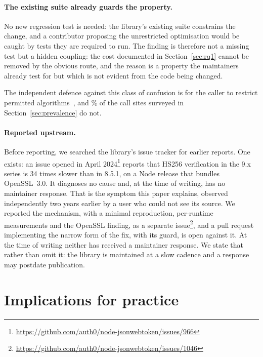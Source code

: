 \documentclass[pdflatex,sn-basic,twocolumn]{sn-jnl}%
\begin{document}
\paragraph{The existing suite already guards the property.} No new regression
test is needed: the library's existing suite constrains the change, and a
contributor proposing the unrestricted optimisation would be caught by tests
they are required to run. The finding is therefore not a missing test but a
hidden coupling: the cost documented in Section~\ref{sec:rq1} cannot be removed
by the obvious route, and the reason is a property the maintainers already test
for but which is not evident from the code being changed.

The independent defence against this class of confusion is for the caller to
restrict permitted algorithms~\citep{rfc8725}, and \SampleNoAlgorithmsPct\% of the
call sites surveyed in Section~\ref{sec:prevalence} do not.

\paragraph{Reported upstream.} Before reporting, we searched the library's issue
tracker for earlier reports. One exists: an issue opened in April
2024\footnote{\url{https://github.com/auth0/node-jsonwebtoken/issues/966}} reports that HS256 verification in the 9.x
series is 34 times slower than in 8.5.1, on a Node release that bundles
OpenSSL~3.0. It diagnoses no cause and, at the time of writing, has no
maintainer response. That is the symptom this paper explains, observed
independently two years earlier by a user who could not see its source. We
reported the mechanism, with a minimal reproduction, per-runtime measurements
and the OpenSSL finding, as a separate
issue\footnote{\url{https://github.com/auth0/node-jsonwebtoken/issues/1046}}, and
a pull request implementing the narrow form of the fix, with its guard, is open
against it.
At the time of writing neither has received a maintainer response. We
state that rather than omit it: the library is maintained at a slow cadence and
a response may postdate publication.

\section{Implications for practice}\label{sec:implications}
\end{document}
